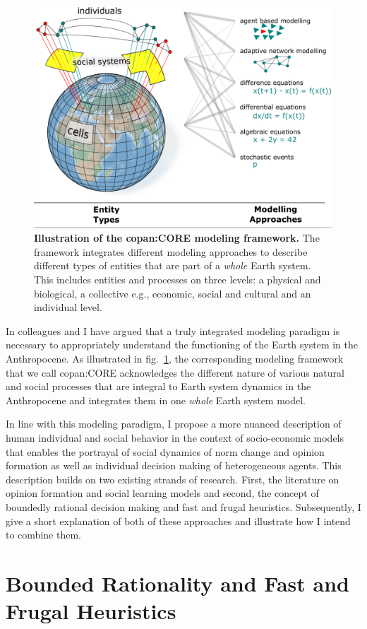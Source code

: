 \begin{figure}[t]
  \centering
  \includegraphics[width = .8 \textwidth]{figures/CORE.png}
  \caption{\textbf{Illustration of the copan:CORE modeling framework.} The framework integrates different modeling approaches to describe different types of entities that are part of a \emph{whole} Earth system. This includes entities and processes on three levels: a physical and biological, a collective e.g., economic, social and cultural and an individual level.}
  \label{fig:Core}
\end{figure}
In \citep{Donges2018} colleagues and I have argued that a truly integrated modeling paradigm is necessary to appropriately understand the functioning of the Earth system in the Anthropocene. As illustrated in fig.~\ref{fig:Core}, the corresponding modeling framework that we call copan:CORE acknowledges the different nature of various natural and social processes that are integral to Earth system dynamics in the Anthropocene and integrates them in one \emph{whole} Earth system model.

In line with this modeling paradigm, I propose a more nuanced description of human individual and social behavior in the context of socio-economic models that enables the portrayal of social dynamics of norm change and opinion formation as well as individual decision making of heterogeneous agents. 
This description builds on two existing strands of research. First, the literature on opinion formation and social learning models and second, the concept of boundedly rational decision making and fast and frugal heuristics. Subsequently, I give a short explanation of both of these approaches and illustrate how I intend to combine them.

\section{Bounded Rationality and Fast and Frugal Heuristics}
\label{sec:intro_bounded_rationality} 

